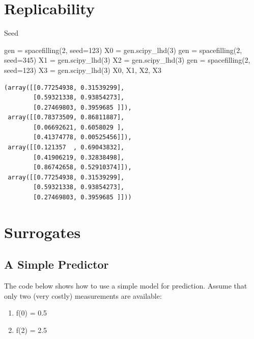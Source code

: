 \documentclass[
  letterpaper,
  DIV=11,
  numbers=noendperiod]{scrreprt}
\newenvironment{Shaded}{\begin{snugshade}}{\end{snugshade}}
\newcommand{\DecValTok}[1]{\textcolor[rgb]{0.68,0.00,0.00}{#1}}
\newcommand{\NormalTok}[1]{\textcolor[rgb]{0.00,0.23,0.31}{#1}}
\newcommand{\OperatorTok}[1]{\textcolor[rgb]{0.37,0.37,0.37}{#1}}
\providecommand{\tightlist}{%
  \setlength{\itemsep}{0pt}\setlength{\parskip}{0pt}}\usepackage{longtable,booktabs,array}
\begin{document}
\section{Replicability}\label{replicability}

Seed

\begin{Shaded}
\begin{Highlighting}[]
\NormalTok{gen }\OperatorTok{=}\NormalTok{ spacefilling(}\DecValTok{2}\NormalTok{, seed}\OperatorTok{=}\DecValTok{123}\NormalTok{)}
\NormalTok{X0 }\OperatorTok{=}\NormalTok{ gen.scipy\_lhd(}\DecValTok{3}\NormalTok{)}
\NormalTok{gen }\OperatorTok{=}\NormalTok{ spacefilling(}\DecValTok{2}\NormalTok{, seed}\OperatorTok{=}\DecValTok{345}\NormalTok{)}
\NormalTok{X1 }\OperatorTok{=}\NormalTok{ gen.scipy\_lhd(}\DecValTok{3}\NormalTok{)}
\NormalTok{X2 }\OperatorTok{=}\NormalTok{ gen.scipy\_lhd(}\DecValTok{3}\NormalTok{)}
\NormalTok{gen }\OperatorTok{=}\NormalTok{ spacefilling(}\DecValTok{2}\NormalTok{, seed}\OperatorTok{=}\DecValTok{123}\NormalTok{)}
\NormalTok{X3 }\OperatorTok{=}\NormalTok{ gen.scipy\_lhd(}\DecValTok{3}\NormalTok{)}
\NormalTok{X0, X1, X2, X3}
\end{Highlighting}
\end{Shaded}

\begin{verbatim}
(array([[0.77254938, 0.31539299],
        [0.59321338, 0.93854273],
        [0.27469803, 0.3959685 ]]),
 array([[0.78373509, 0.86811887],
        [0.06692621, 0.6058029 ],
        [0.41374778, 0.00525456]]),
 array([[0.121357  , 0.69043832],
        [0.41906219, 0.32838498],
        [0.86742658, 0.52910374]]),
 array([[0.77254938, 0.31539299],
        [0.59321338, 0.93854273],
        [0.27469803, 0.3959685 ]]))
\end{verbatim}

\section{Surrogates}\label{surrogates-1}

\subsection{A Simple Predictor}\label{a-simple-predictor-1}

The code below shows how to use a simple model for prediction. Assume
that only two (very costly) measurements are available:

\begin{enumerate}
\def\labelenumi{\arabic{enumi}.}
\tightlist
\item
  f(0) = 0.5
\item
  f(2) = 2.5
\end{enumerate}
\end{document}
